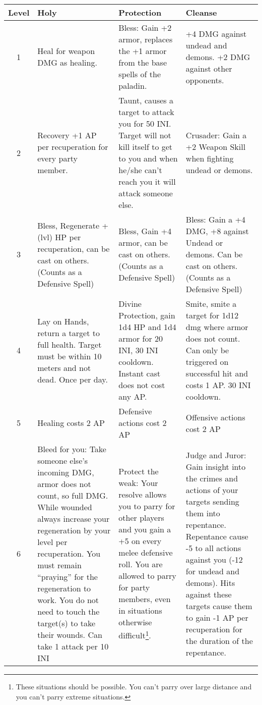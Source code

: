 \begin{longtable}{ c p{4cm} p{4cm} p{4cm} }

Level & Holy & Protection & Cleanse \\
 \hline
1 &  
Heal for weapon DMG as healing. &
Bless: Gain +2 armor, replaces the +1 armor from the base spells of the paladin. &
+4 DMG against undead and demons. +2 DMG against other opponents. \\

2 &
Recovery +1 AP per recuperation for every party member. &
Taunt, causes a target to attack you for 50 INI. Target will not kill itself to get to you and when he/she can't reach you it will attack someone else. &
Crusader: Gain a +2 Weapon Skill when fighting undead or demons. \\
 
3 &
Bless, Regenerate +(lvl) HP per recuperation, can be cast on others. (Counts as a Defensive Spell) &
Bless, Gain +4 armor, can be cast on others. (Counts as a Defensive Spell) &
Bless: Gain a +4 DMG, +8 against Undead or demons. Can be cast on others. (Counts as a Defensive Spell) \\
 
4 &
Lay on Hands, return a target to full health. Target must be within 10 meters and not dead. Once per day. &
Divine Protection, gain 1d4 HP and 1d4 armor for 20 INI, 30 INI cooldown. Instant cast does not cost any AP. &
Smite, smite a target for 1d12 dmg where armor does not count. Can only be triggered on successful hit and costs 1 AP. 30 INI cooldown. \\
 
5 &
Healing costs 2 AP  &
Defensive actions cost 2 AP &
Offensive actions cost 2 AP \\
 
6 &
Bleed for you: Take someone else’s incoming DMG, armor does not count, so full DMG. While wounded always increase your regeneration by your level per recuperation. You must remain “praying” for the regeneration to work. You do not need to touch the target(s) to take their wounds. Can take 1 attack per 10 INI &
Protect the weak: Your resolve allows you to parry for other players and you gain a +5 on every melee defensive roll. You are allowed to parry for party members, even in situations otherwise difficult\footnote{These situations should be possible. You can't parry over large distance and you can't parry extreme situations.}. &
Judge and Juror: Gain insight into the crimes and actions of your targets sending them into repentance. Repentance cause -5 to all actions against you (-12 for undead and demons). Hits against these targets cause them to gain -1 AP per recuperation for the duration of the repentance. \\
 

\end{longtable}
